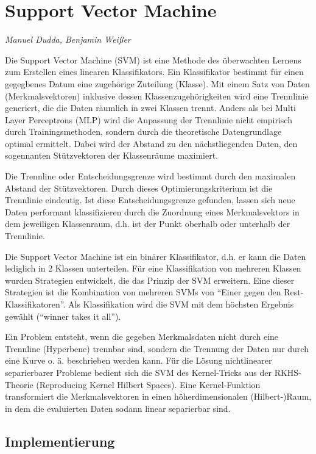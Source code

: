 \section{Support Vector Machine}
\textit{Manuel Dudda, Benjamin Weißer}

Die Support Vector Machine (SVM) ist eine Methode des überwachten Lernens zum Erstellen eines linearen Klassifikators. Ein Klassifikator bestimmt für einen gegegbenes Datum eine zugehörige Zuteilung (Klasse). Mit einem Satz von Daten (Merkmalsvektoren) inklusive dessen Klassenzugehörigkeiten wird eine Trennlinie generiert, die die Daten räumlich in zwei Klassen trennt. Anders als bei Multi Layer Perceptrons (MLP) wird die Anpassung der Trennlinie nicht empirisch durch Trainingsmethoden, sondern durch die theoretische Datengrundlage optimal ermittelt. Dabei wird der Abstand zu den nächstliegenden Daten, den sogennanten Stützvektoren der Klassenräume maximiert.


Die Trennline oder Entscheidungsgrenze wird bestimmt durch den maximalen Abstand der Stützvektoren. Durch dieses Optimierungskriterium ist die Trennlinie eindeutig. Ist diese Entscheidungsgrenze gefunden, lassen sich neue Daten performant klassifizieren durch die Zuordnung eines Merkmalsvektors in dem jeweiligen Klassenraum, d.h. ist der Punkt oberhalb oder unterhalb der Trennlinie.

Die Support Vector Machine ist ein binärer Klassifikator, d.h. er kann die Daten lediglich in 2 Klassen unterteilen. Für eine Klassifikation von mehreren Klassen wurden Strategien entwickelt, die das Prinzip der SVM erweitern. Eine dieser Strategien ist die Kombination von mehreren SVMs von “Einer gegen den Rest-Klassifikatoren”. Als Klassifikation wird die SVM mit dem höchsten Ergebnis gewählt (“winner takes it all”).

Ein Problem entsteht, wenn die gegeben Merkmalsdaten nicht durch eine Trennline (Hyperbene) trennbar sind, sondern die Trennung der Daten nur durch eine Kurve o. ä. beschrieben werden kann. Für die Lösung nichtlinearer separierbarer Probleme bedient sich die SVM des Kernel-Tricks aus der RKHS-Theorie (Reproducing Kernel Hilbert Spaces). Eine Kernel-Funktion transformiert die Merkmalsvektoren in einen höherdimensionalen (Hilbert-)Raum, in dem die evaluierten Daten sodann linear separierbar sind.


\subsection{Implementierung}

